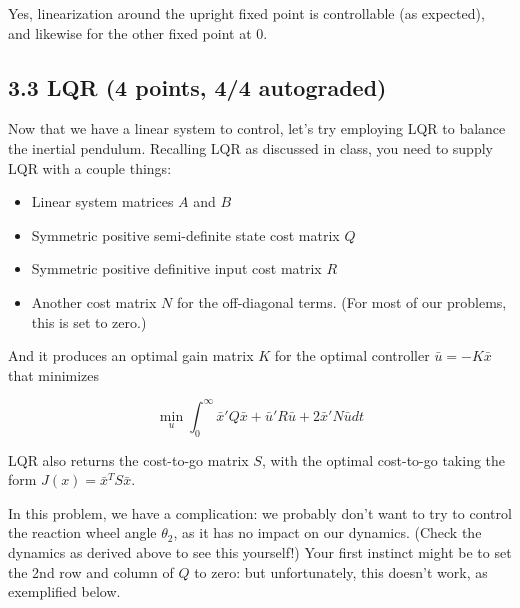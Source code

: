 \documentclass[11pt]{article}
\providecommand{\tightlist}{%
      \setlength{\itemsep}{0pt}\setlength{\parskip}{0pt}}
\begin{document}
Yes, linearization around the upright fixed point is controllable (as
expected), and likewise for the other fixed point at 0.

    \subsection{3.3 LQR (4 points, 4/4
autograded)}\label{lqr-4-points-44-autograded}

Now that we have a linear system to control, let's try employing LQR to
balance the inertial pendulum. Recalling LQR as discussed in class, you
need to supply LQR with a couple things:

\begin{itemize}
\tightlist
\item
  Linear system matrices \(A\) and \(B\)
\item
  Symmetric positive semi-definite state cost matrix \(Q\)
\item
  Symmetric positive definitive input cost matrix \(R\)
\item
  Another cost matrix \(N\) for the off-diagonal terms. (For most of our
  problems, this is set to zero.)
\end{itemize}

And it produces an optimal gain matrix \(K\) for the optimal controller
\(\bar{u} = - K\bar{x}\) that minimizes

\[\min_u \int_0^\infty \bar{x}'Q\bar{x} + \bar{u}'R\bar{u} + 2\bar{x}'N\bar{u} dt \]

LQR also returns the cost-to-go matrix \(S\), with the optimal
cost-to-go taking the form \(J(x) = \bar{x}^T S \bar{x}\).

In this problem, we have a complication: we probably don't want to try
to control the reaction wheel angle \(\theta_2\), as it has no impact on
our dynamics. (Check the dynamics as derived above to see this
yourself!) Your first instinct might be to set the 2nd row and column of
\(Q\) to zero: but unfortunately, this doesn't work, as exemplified
below.
\end{document}
